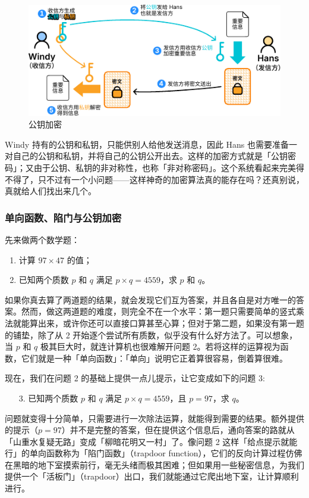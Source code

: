 \begin{figure}[htb!]
  \centering
  \includegraphics[width=.8\textwidth]{assets/surpass/Public_key_encryption.pdf}
  \caption{公钥加密}
  \label{fig:Public_key_encryption}
\end{figure}

Windy 持有的公钥和私钥，只能供别人给他发送消息，因此 Hans 也需要准备一对自己的公钥和私钥，并将自己的公钥公开出去。这样的加密方式就是「公钥密码」；又由于公钥、私钥的非对称性，也称「非对称密码」。这个系统看起来完美得不得了，只不过有一个小问题——这样神奇的加密算法真的能存在吗？还真别说，真就给人们找出来几个。

\subsubsection{单向函数、陷门与公钥加密}

先来做两个数学题：
\begin{enumerate}
  \item 计算 $97\times 47$ 的值；
  \item 已知两个质数 $p$ 和 $q$ 满足 $p\times q=4559$，求 $p$ 和 $q$。
\end{enumerate}

如果你真去算了两道题的结果，就会发现它们互为答案，并且各自是对方唯一的答案。然而，做这两道题的难度，则完全不在一个水平：第一题只需要简单的竖式乘法就能算出来，或许你还可以直接口算甚至心算；但对于第二题，如果没有第一题的铺垫，除了从 2 开始逐个尝试所有质数，似乎没有什么好方法了。可以想象，当 $p$ 和 $q$ 极其巨大时，就连计算机也很难解开问题 2。若将这样的运算视为函数，它们就是一种「单向函数」：「单向」说明它正着算很容易，倒着算很难。

现在，我们在问题 2 的基础上提供一点儿提示，让它变成如下的问题 3:
\begin{enumerate}
  \item[3.] 已知两个质数 $p$ 和 $q$ 满足 $p\times q=4559$，且 $p=97$，求 $q$。
\end{enumerate}
问题就变得十分简单，只需要进行一次除法运算，就能得到需要的结果。额外提供的提示（$p=97$）并不是完整的答案，但在提供这个信息后，通向答案的路就从「山重水复疑无路」变成「柳暗花明又一村」了。像问题 2 这样「给点提示就能行」的单向函数称为「陷门函数」（trapdoor function），它们的反向计算过程仿佛在黑暗的地下室摸索前行，毫无头绪而极其困难；但如果用一些秘密信息，为我们提供一个「活板门」（trapdoor）出口，我们就能通过它爬出地下室，让计算顺利进行。

